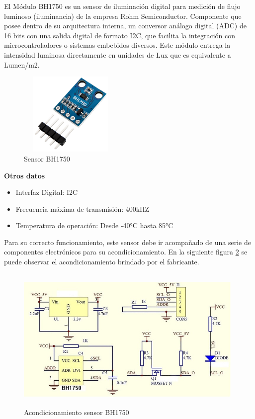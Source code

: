 El Módulo BH1750 es un sensor de iluminación digital para medición de flujo luminoso (iluminancia) de la empresa Rohm Semiconductor. Componente que posee dentro de su arquitectura interna, un conversor análogo digital (ADC) de 16 bits con una salida digital de formato I2C, que facilita la integración con microcontroladores o sistemas embebidos diversos. Este módulo entrega la intensidad luminosa directamente en unidades de Lux que es equivalente a Lumen/m2.\\

\begin{figure}[H]
    \centering
    \includegraphics[width=5cm, height=4cm]{imagenes/Sensor BH1750.jpg}
    \caption{Sensor BH1750}
    \label{imag:BH1750}
 \end{figure}

\textbf{Otros datos}

\begin{itemize}
    \item Interfaz Digital: I2C
    \item Frecuencia máxima de transmisión: 400kHZ
    \item Temperatura de operación: Desde -40°C hasta 85°C
\end{itemize}

Para su correcto funcionamiento, este sensor debe ir acompañado de una serie de componentes electrónicos para su acondicionamiento.
En la siguiente figura \ref{imag:acondicionamiento_BH1750} se puede observar el acondicionamiento brindado por el fabricante.

\begin{figure}[H]
    \centering
    \includegraphics[width=11cm, height=7cm]{imagenes/acondicionamientos sensor BH1750.jpg}
    \caption{Acondicionamiento sensor BH1750}
    \label{imag:acondicionamiento_BH1750}
\end{figure}


